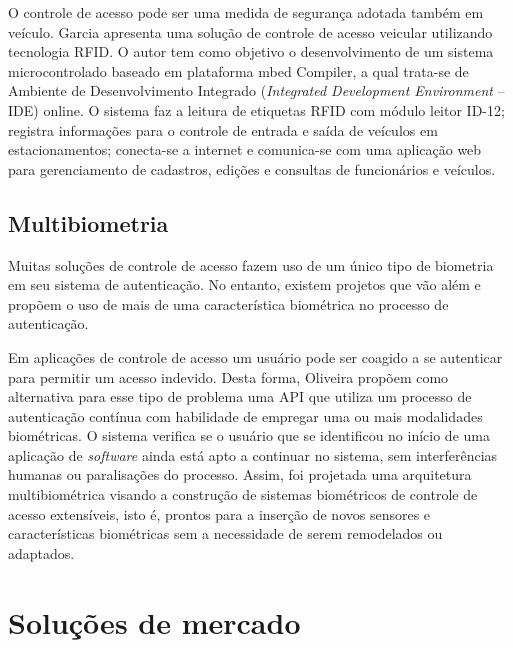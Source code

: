  
 O controle de acesso pode ser uma medida de segurança adotada também em veículo. Garcia \cite{garcia2013sistema} apresenta uma solução de controle de acesso veicular utilizando tecnologia RFID. O autor tem como objetivo o desenvolvimento de um sistema microcontrolado baseado em plataforma mbed Compiler, a qual trata-se de Ambiente de Desenvolvimento Integrado (\textit{Integrated Development Environment} -- IDE) online. O sistema faz a leitura de etiquetas RFID com módulo leitor ID-12; registra informações para o controle de entrada e saída de veículos em estacionamentos; conecta-se a internet e comunica-se com uma aplicação web para gerenciamento de cadastros, edições e consultas de funcionários e veículos.
 
 

 \subsection{Multibiometria}

 Muitas soluções de controle de acesso fazem uso de um único tipo de biometria em seu sistema de autenticação. No entanto, existem projetos que vão além e propõem o uso de mais de uma característica biométrica no processo de autenticação.
 
 Em aplicações de controle de acesso um usuário pode ser coagido a se autenticar para permitir um acesso indevido. Desta forma, Oliveira \cite{oliveira2011api} propõem como alternativa para esse tipo de problema uma API que utiliza um processo de autenticação contínua com habilidade de empregar uma ou mais modalidades biométricas. O sistema verifica se o usuário que se identificou no início de uma aplicação de \textit{software} ainda está apto a continuar no sistema, sem interferências humanas ou paralisações do processo. Assim, foi projetada uma arquitetura multibiométrica visando a construção de sistemas biométricos de controle de acesso extensíveis, isto é, prontos para a inserção de novos sensores e características biométricas sem a necessidade de serem remodelados ou adaptados.







\section{Soluções de mercado\label{solucoes_mercado}}

